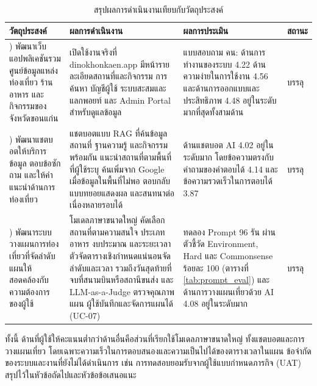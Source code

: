 \begin{table}[H]
\centering
\caption{สรุปผลการดำเนินงานเทียบกับวัตถุประสงค์}
\label{tab:objectives}
{\small
\begin{tabular}{|>{\raggedright\arraybackslash}p{3.1cm}|>{\raggedright\arraybackslash}p{4.5cm}|>{\raggedright\arraybackslash}p{4.3cm}|>{\raggedright\arraybackslash}p{1.7cm}|}
\hline
\textbf{วัตถุประสงค์} & \textbf{ผลการดำเนินงาน} & \textbf{ผลการประเมิน} & \textbf{สถานะ} \\
\hline
1) พัฒนาเว็บแอปพลิเคชันรวมศูนย์ข้อมูลแหล่งท่องเที่ยว ร้านอาหาร และกิจกรรมของจังหวัดขอนแก่น & เปิดใช้งานจริงที่ dinokhonkaen.app มีหน้ารายละเอียดสถานที่และกิจกรรม การค้นหา บัญชีผู้ใช้ ระบบสะสมและแลกพอยท์ และ Admin Portal สำหรับดูแลข้อมูล & แบบสอบถาม \surveyN{} คน: ด้านการทำงานของระบบ 4.22 ด้านความง่ายในการใช้งาน 4.56 และด้านการออกแบบและประสิทธิภาพ 4.48 อยู่ในระดับมากที่สุดทั้งสามด้าน & บรรลุ \\ \hline
2) พัฒนาแชตบอตให้บริการข้อมูล ตอบข้อซักถาม และให้คำแนะนำด้านการท่องเที่ยว & แชตบอตแบบ RAG ที่ค้นข้อมูลสถานที่ ฐานความรู้ และกิจกรรมพร้อมกัน แนะนำสถานที่ตามพื้นที่ที่ผู้ใช้ระบุ ค้นเพิ่มจาก Google เมื่อข้อมูลในพื้นที่ไม่พอ ตอบกลับแบบทยอยแสดงผล และสนทนาต่อเนื่องหลายรอบได้ & ด้านแชตบอต AI 4.02 อยู่ในระดับมาก โดยข้อความตรงกับคำถามของคำตอบได้ 4.14 และข้อความรวดเร็วในการตอบได้ 3.87 & บรรลุ \\ \hline
3) พัฒนาระบบวางแผนการท่องเที่ยวที่จัดลำดับแผนให้สอดคล้องกับความต้องการของผู้ใช้ & โมเดลภาษาขนาดใหญ่ คัดเลือกสถานที่ตามความสนใจ ประเภทอาหาร งบประมาณ และระยะเวลา ตัวจัดตารางเชิงกำหนดแน่นอนจัดลำดับและเวลา รวมถึงวันสุดท้ายที่จบที่สนามบินหรือสถานีขนส่ง และ LLM-as-a-Judge ตรวจคุณภาพแผน ผู้ใช้บันทึกและจัดการแผนได้ (UC-07) & ทดลอง Prompt 96 รัน ผ่านตัวชี้วัด Environment, Hard และ Commonsense ร้อยละ 100 (ตารางที่ \ref{tab:prompt_eval}) และด้านการวางแผนเที่ยวด้วย AI 4.08 อยู่ในระดับมาก & บรรลุ \\ \hline
\end{tabular}
\par}
\end{table}

ทั้งนี้ ด้านที่ผู้ใช้ให้คะแนนต่ำกว่าด้านอื่นคือส่วนที่เรียกใช้โมเดลภาษาขนาดใหญ่ ทั้งแชตบอตและการวางแผนเที่ยว โดยเฉพาะความเร็วในการตอบสนองและความเป็นไปได้ของตารางเวลาในแผน ข้อจำกัดของระบบและงานที่ยังไม่ได้ดำเนินการ เช่น การทดสอบยอมรับจากผู้ใช้แบบกำหนดภารกิจ (UAT) สรุปไว้ในหัวข้อถัดไปและหัวข้อข้อเสนอแนะ

